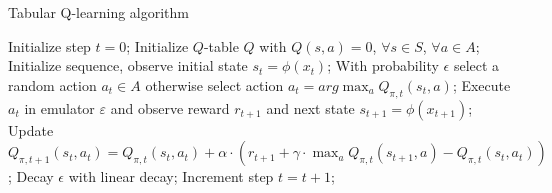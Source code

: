 \begin{algorithm}[H]
\small
\caption*{Tabular Q-learning algorithm}
\begin{algorithmic}
    \STATE Initialize step $t = 0$;
    \STATE Initialize $Q$-table $Q$ with $Q(s,a)=0$, $\forall s \in S$, $\forall a \in A$;
        \bindent
        \STATE Initialize sequence, observe initial state $s_t=\phi(x_t)$;
            \bindent
            \STATE With probability $\epsilon$ select a random action $a_t \in A$
            \STATE otherwise select action $a_t = arg\max_{a}Q_{\pi,t}(s_t,a)$;
            \STATE Execute $a_t$ in  emulator $\varepsilon$ and observe reward $r_{t+1}$ and next state $s_{t+1}=\phi(x_{t+1})$;
            \STATE Update $Q_{\pi,t+1}(s_{t},a_{t}) =Q_{\pi,t}(s_{t},a_{t})+\alpha \cdot (r_{t+1}+\gamma \cdot \max_{a}Q_{\pi,t}(s_{t+1},a)-Q_{\pi,t}(s_{t},a_{t}))$;
            \STATE Decay $\epsilon$ with linear decay;
            \STATE Increment step $t = t + 1$;
            \eindent
        \ENDWHILE
        \eindent
    \ENDFOR
\end{algorithmic}
\end{algorithm}

\pagebreak